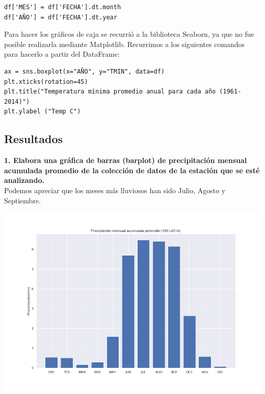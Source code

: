 \documentclass[12pt]{article}
\begin{document}
\begin{center}
\begin{verbatim}
df['MES'] = df['FECHA'].dt.month
df['AÑO'] = df['FECHA'].dt.year
 \end{verbatim}
\end{center} Para hacer los gráficos de caja se recurrió a la biblioteca Seaborn, ya que no fue posible realizarla mediante Matplotlib.
Recurrimos a los siguientes comandos para hacerlo a partir del DataFrame:
\begin{center}
\begin{verbatim}
ax = sns.boxplot(x="AÑO", y="TMIN", data=df)
plt.xticks(rotation=45)
plt.title("Temperatura mínima promedio anual para cada año (1961-2014)")
plt.ylabel ("Temp C")
 \end{verbatim}
\end{center}

\newpage
\subsection{Resultados}
\noindent\textbf {1. Elabora una gráfica de barras (barplot) de precipitación mensual acumulada promedio de la colección de datos de la estación que se esté analizando.} \\
Podemos apreciar que los meses más lluviosos han sido Julio, Agosto y Septiembre.
\begin{center}
\includegraphics[scale=0.4]{Precip_men.png}
\end{center}
\end{document}
